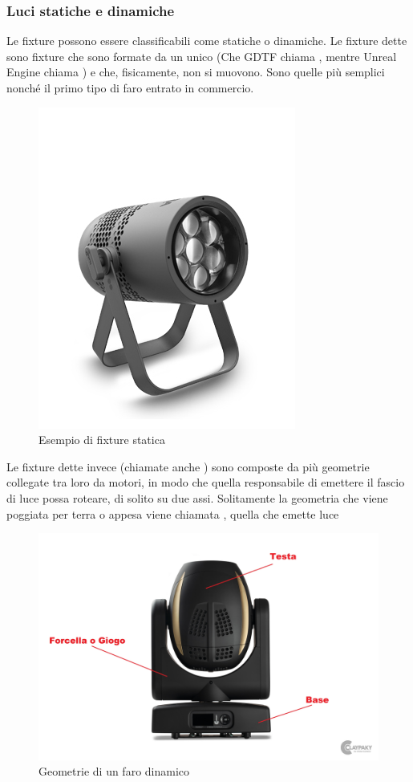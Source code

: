 \documentclass[main.tex]{subfiles}
\begin{document}
\subsubsection{Luci statiche e dinamiche}
Le fixture possono essere classificabili come statiche o dinamiche. Le fixture dette  sono fixture che sono formate da un unico  (Che GDTF chiama , mentre Unreal Engine chiama ) e che, fisicamente, non si muovono. Sono quelle più semplici nonché il primo tipo di faro entrato in commercio.
\begin{figure}[H]
    \centering
    \includegraphics[width=0.4\linewidth]{img/introduzione/staticFixtureExample.jpg}
    \caption{Esempio di fixture statica}
    \label{fig:staticFixture}
\end{figure}
Le fixture dette invece  (chiamate anche ) sono composte da più geometrie collegate tra loro da motori, in modo che quella responsabile di emettere il fascio di luce possa roteare, di solito su due assi. Solitamente la geometria che viene poggiata per terra o appesa viene chiamata , quella che emette luce 
\begin{figure}[H]
    \centering
    \includegraphics[width=0.75\linewidth]{img/introduzione/dynamicFixtureAnatomy.jpg}
    \caption{Geometrie di un faro dinamico}
    \label{fig:DynamicFixture}
\end{figure}
\end{document}
